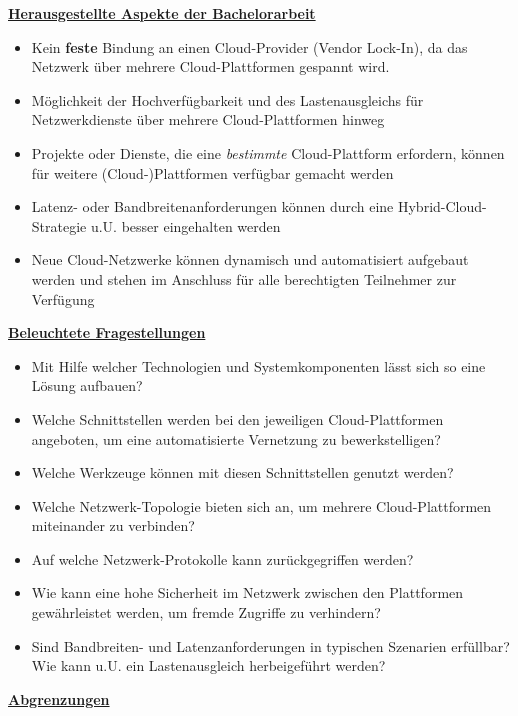 \textbf{\underline{Herausgestellte Aspekte der Bachelorarbeit}}
\begin{itemize}
    \item Kein \textbf{feste} Bindung an einen Cloud-Provider (\glqq Vendor Lock-In\grqq{}), da das Netzwerk über mehrere Cloud-Plattformen gespannt wird.
    \item Möglichkeit der Hochverfügbarkeit und des Lastenausgleichs für Netzwerkdienste über mehrere Cloud-Plattformen hinweg
    \item Projekte oder Dienste, die eine \textit{bestimmte} Cloud-Plattform erfordern, können für weitere (Cloud-)Plattformen verfügbar gemacht werden
    \item Latenz- oder Bandbreitenanforderungen können durch eine Hybrid-Cloud-Strategie u.U. besser eingehalten werden
    \item Neue Cloud-Netzwerke können dynamisch und automatisiert aufgebaut werden und stehen im Anschluss für alle berechtigten Teilnehmer zur Verfügung
\end{itemize}

\textbf{\underline{Beleuchtete Fragestellungen}}
\begin{itemize}
    \item Mit Hilfe welcher Technologien und Systemkomponenten lässt sich so eine Lösung aufbauen?
    \item Welche Schnittstellen werden bei den jeweiligen Cloud-Plattformen angeboten, um eine automatisierte Vernetzung zu bewerkstelligen?
    \item Welche Werkzeuge können mit diesen Schnittstellen genutzt werden?
    \item Welche Netzwerk-Topologie bieten sich an, um mehrere Cloud-Plattformen miteinander zu verbinden?
    \item Auf welche Netzwerk-Protokolle kann zurückgegriffen werden?
    \item Wie kann eine hohe Sicherheit im Netzwerk zwischen den Plattformen gewährleistet werden, um fremde Zugriffe zu verhindern?
    \item Sind Bandbreiten- und Latenzanforderungen in typischen Szenarien erfüllbar? Wie kann u.U. ein Lastenausgleich herbeigeführt werden?
\end{itemize}

\textbf{\underline{Abgrenzungen}}\label{abgrenzung}

